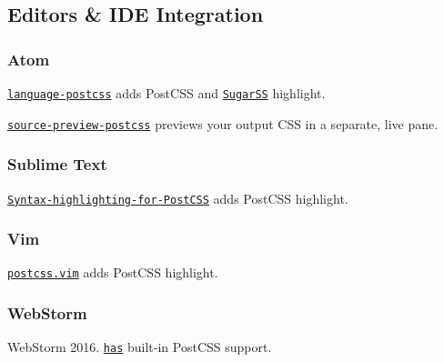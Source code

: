 \subsection*{Editors \& I\+DE Integration}

\subsubsection*{Atom}


\begin{DoxyItemize}
\item \href{https://atom.io/packages/language-postcss}{\tt {\ttfamily language-\/postcss}} adds Post\+C\+SS and \href{https://github.com/postcss/sugarss}{\tt Sugar\+SS} highlight.
\item \href{https://atom.io/packages/source-preview-postcss}{\tt {\ttfamily source-\/preview-\/postcss}} previews your output C\+SS in a separate, live pane.
\end{DoxyItemize}

\subsubsection*{Sublime Text}


\begin{DoxyItemize}
\item \href{https://github.com/hudochenkov/Syntax-highlighting-for-PostCSS}{\tt {\ttfamily Syntax-\/highlighting-\/for-\/\+Post\+C\+SS}} adds Post\+C\+SS highlight.
\end{DoxyItemize}

\subsubsection*{Vim}


\begin{DoxyItemize}
\item \href{https://github.com/stephenway/postcss.vim}{\tt {\ttfamily postcss.\+vim}} adds Post\+C\+SS highlight.
\end{DoxyItemize}

\subsubsection*{Web\+Storm}

Web\+Storm 2016. \href{https://blog.jetbrains.com/webstorm/2016/08/webstorm-2016-3-early-access-preview/}{\tt has} built-\/in Post\+C\+SS support. 